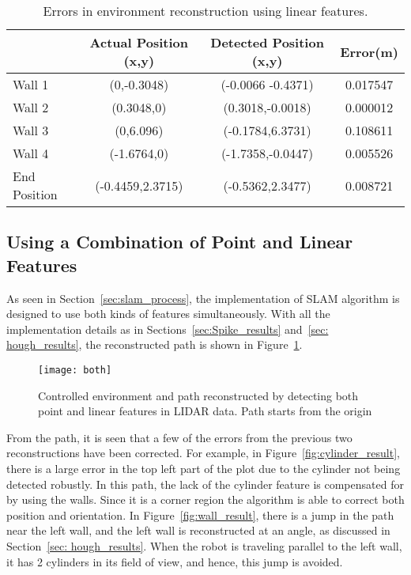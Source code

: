 \begin{table}
\caption{Errors in environment reconstruction using linear features.}
\label{tab:wall_results}
\begin{tabular}{| l | c | c | c |}
\hline ~ & Actual Position (x,y) & Detected Position (x,y) & Error(m)\\
\hline Wall 1 & (0,-0.3048) & (-0.0066 -0.4371) & 0.017547 \\ 
\hline Wall 2 & (0.3048,0) & (0.3018,-0.0018) & 0.000012 \\ 
\hline Wall 3 & (0,6.096) & (-0.1784,6.3731) & 0.108611 \\ 
\hline Wall 4 & (-1.6764,0) & (-1.7358,-0.0447) & 0.005526 \\
\hline End Position & (-0.4459,2.3715) & (-0.5362,2.3477) & 0.008721 \\
\hline 
\end{tabular} 
\end{table}

\subsection{Using a Combination of Point and Linear Features}
\label{sec:combo_result}

As seen in Section~\ref{sec:slam_process}, the implementation of SLAM algorithm is designed to use both kinds of features simultaneously. With all the implementation details as in Sections~\ref{sec:Spike_results} and~\ref{sec: hough_results}, the reconstructed path is shown in Figure~\ref{fig:combo_result}.

\begin{figure}
\centering
\texttt{[image: both]}
\caption{Controlled environment and path reconstructed by detecting both point and linear features in LIDAR data. Path starts from the origin}
\label{fig:combo_result}
\end{figure}


From the path, it is seen that a few of the errors from the previous two reconstructions have been corrected. For example, in Figure~\ref{fig:cylinder_result}, there is a large error in the top left part of the plot due to the cylinder not being detected robustly. In this path, the lack of the  cylinder feature is compensated for by using the walls. Since it is a corner region the algorithm is able to correct both position and orientation. In Figure~\ref{fig:wall_result}, there is a jump in the path near the left wall, and the left wall is reconstructed at an angle, as discussed in Section~\ref{sec: hough_results}. When the robot is traveling parallel to the left wall, it has 2 cylinders in its field of view, and hence, this jump is avoided.

